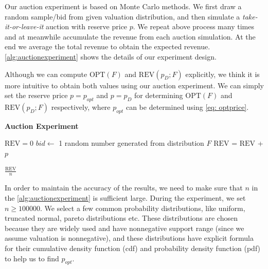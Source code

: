 Our auction experiment is based on Monte Carlo methods. We first draw a random sample/bid from given valuation distribution, and then simulate a \textit{take-it-or-leave-it} auction with reserve price $p$. We repeat above process many times and at meanwhile accumulate the revenue from each auction simulation. At the end we average the total revenue to obtain the expected revenue. \cref{alg:auctionexperiment} shows the details of our experiment design.
 
Although we can compute $\text{OPT}(F)$ and $\text{REV}(p_D;F)$ explicitly, we think it is more intuitive to obtain both values using our auction experiment. We can simply set the reserve price $p = p_{opt}$ and $p = p_D$ for determining $\text{OPT}(F)$ and $\text{REV}(p_D;F)$ respectively, where $p_{opt}$ can be determined using \cref{eq: optprice}.

\begin{algorithm}
\caption{\textbf{Auction Experiment}} \label{alg:auctionexperiment}
\begin{algorithmic}[1]
	 
		\State $\text{REV} = 0$
		    \State $bid \gets$ 1 random number generated from distribution $F$ 
				\State $\text{REV}$ = $\text{REV}$ + $p$ 
			\EndIf
			
		\EndFor
		\State \Return $\frac{\text{REV}}{n}$
	\EndProcedure	
\end{algorithmic}
\end{algorithm}
In order to maintain the accuracy of the results, we need to make sure that $n$ in the \cref{alg:auctionexperiment} is sufficient large. During the experiment, we set $n \geqslant 100000$. We select a few common probability distributions, like uniform, truncated normal, pareto distributions etc. These distributions are chosen because they are widely used and have nonnegative support range (since we assume valuation is nonnegative), and these distributions have explicit formula for their cumulative density function (cdf) and probability density function (pdf) to help us to find $p_{opt}$.
\newpage
